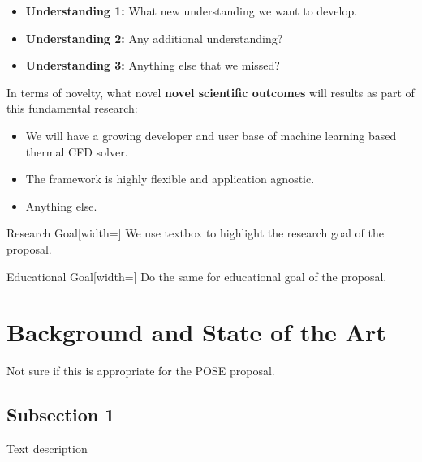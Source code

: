 \documentclass[11pt]{article}
\begin{document}
\vspace{-10pt}
\begin{itemize}[label=\textbullet, align=left, labelwidth=4em, labelsep=1em, leftmargin=*,noitemsep]
    \item \textbf{Understanding 1:} What new understanding we want to develop.
    \item \textbf{Understanding 2:} Any additional understanding?
    \item \textbf{Understanding 3:} Anything else that we missed?
\end{itemize}

\vspace{-10pt}
In terms of novelty, what novel \textbf{novel scientific outcomes} will results as part of this fundamental research:

\vspace{-10pt}
\begin{itemize}[label=\textbullet, align=left, labelwidth=4em, labelsep=1em, leftmargin=*,noitemsep]
    \item We will have a growing developer and user base of machine learning based thermal CFD solver.
    \item The framework is highly flexible and application agnostic.
    \item Anything else.
\end{itemize}


\begin{dashtcb}[FlyersBlue]{Research Goal}[width=\linewidth]
We use textbox to highlight the research goal of the proposal.
\end{dashtcb}

\begin{dashtcb}[FlyersRed]{Educational Goal}[width=\linewidth]
	Do the same for educational goal of the proposal.
\end{dashtcb}

\section{Background and State of the Art}
\label{sec:background}

Not sure if this is appropriate for the POSE proposal.

\subsection{Subsection 1}
\label{sec:subsection1}

Text description
\end{document}
